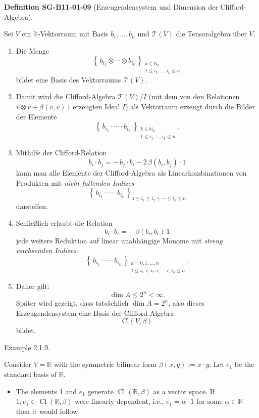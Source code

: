 \documentclass[10pt, letterpaper]{article}
\newcommand{\Cl}{\mathrm{Cl}}
\newcommand{\CustomHeading}[3]{%
  \par\medskip\noindent%
  \textbf{#1 #2} \textnormal{(#3)}.\enskip%
}
\newenvironment{DEF}[2]{\begin{unitbox}\CustomHeading{Definition}{#1}{#2}}{\end{unitbox}}
\begin{document}
\begin{DEF}{SG-B11-01-09}{Erzeugendensystem und Dimension der Clifford-Algebra}
Sei $V$ ein $\mathbb K$-Vektorraum mit Basis $b_{1},\dots,b_{n}$ und $\mathcal{T}(V)$ die Tensoralgebra über $V$.

\begin{enumerate}
\item Die Menge
\[
\left\{\,b_{i_{1}}\otimes\cdots\otimes b_{i_{k}}\,\right\}_{\substack{k\in\mathbb N_{0}\\ 1\le i_{1},\dots,i_{k}\le n}}
\]
bildet eine Basis des Vektorraums $\mathcal{T}(V)$.

\item Damit wird die Clifford-Algebra $\mathcal{T}(V)/I$ (mit dem von den Relationen
$v\otimes v+\beta(v,v)\,1$ erzeugten Ideal $I$)
als Vektorraum erzeugt durch die Bilder der Elemente
\[
\left\{\,b_{i_{1}}\cdot\cdots\cdot b_{i_{k}}\,\right\}_{\substack{k\in\mathbb N_{0}\\1\le i_{1},\dots,i_{k}\le n}}.
\]

\item Mithilfe der Clifford-Relation
\[
b_i\cdot b_j=-\,b_j\cdot b_i-2\,\beta(b_i,b_j)\cdot 1
\]
kann man alle Elemente der Clifford-Algebra als Linearkombinationen von Produkten mit \emph{nicht fallenden Indizes}
\[
\left\{\,b_{i_{1}}\cdot\cdots\cdot b_{i_{k}}\,\right\}_{1\le i_{1}\le i_{2}\le\cdots\le i_{k}\le n}
\]
darstellen.

\item Schließlich erlaubt die Relation
\[
b_i\cdot b_i=-\,\beta(b_i,b_i)\,1
\]
jede weitere Reduktion auf linear unabhängige Monome mit \emph{streng wachsenden Indizes}:
\[
\left\{\,b_{i_{1}}\cdot\cdots\cdot b_{i_{k}}\,\right\}_{\substack{k=0,1,\dots,n\\ 1\le i_{1}<i_{2}<\cdots<i_{k}\le n}}.
\]

\item Daher gilt:
\[
\dim A \le 2^{n} < \infty.
\]
Später wird gezeigt, dass tatsächlich $\dim A = 2^{n}$, also dieses Erzeugendensystem eine Basis der Clifford-Algebra
\[
\Cl(V,\beta)
\]
bildet.
\end{enumerate}
\end{DEF}



Example 2.1.9. 

Consider $V=\mathbb{R}$ with the symmetric bilinear form $\beta(x, y):=x \cdot y$. Let $e_{1}$ be the standard basis of $\mathbb{R}$.

\begin{itemize}
  \item The elements 1 and $e_{1}$ generate $\operatorname{Cl}(\mathbb{R}, \beta)$ as a vector space. If $1, e_{1} \in \operatorname{Cl}(\mathbb{R}, \beta)$ were linearly dependent, i.e., $e_{1}=\alpha \cdot 1$ for some $\alpha \in \mathbb{R}$ then it would follow
\end{itemize}
\end{document}
